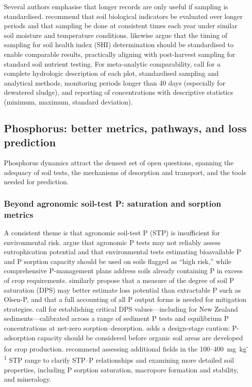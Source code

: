 \documentclass[11pt]{article}
\begin{document}
Several authors emphasise that longer records are only useful if sampling is standardised. \textcite{Sherbine2023} recommend that soil biological indicators be evaluated over longer periods and that sampling be done at consistent times each year under similar soil moisture and temperature conditions. \textcite{Li2023b} likewise argue that the timing of sampling for soil health index (SHI) determination should be standardised to enable comparable results, practically aligning with post-harvest sampling for standard soil nutrient testing. For meta-analytic comparability, \textcite{Ghirardini2019} call for a complete hydrologic description of each plot, standardised sampling and analytical methods, monitoring periods longer than 40 days (especially for dewatered sludge), and reporting of concentrations with descriptive statistics (minimum, maximum, standard deviation).

\subsection{Phosphorus: better metrics, pathways, and loss prediction}

Phosphorus dynamics attract the densest set of open questions, spanning the adequacy of soil tests, the mechanisms of desorption and transport, and the tools needed for prediction.

\subsubsection{Beyond agronomic soil-test P: saturation and sorption metrics}

A consistent theme is that agronomic soil-test P (STP) is insufficient for environmental risk. \textcite{Sharpley1995} argue that agronomic P tests may not reliably assess eutrophication potential and that environmental tests estimating bioavailable P and P sorption capacity should be used on soils flagged as ``high risk,'' while comprehensive P-management plans address soils already containing P in excess of crop requirements. \textcite{Hooda1999} similarly propose that a measure of the degree of soil P saturation (DPS) may better estimate loss potential than extractable P such as Olsen-P, and that a full accounting of all P output forms is needed for mitigation strategies. \textcite{Nguyen2002} call for establishing critical DPS values---including for New Zealand sediments---calibrated across a range of sediment P tests and equilibrium P concentrations at net-zero sorption--desorption. \textcite{MILLER1979} adds a design-stage caution: P-adsorption capacity should be considered before organic soil areas are developed for crop production. \textcite{Osterholz2020} recommend assessing additional fields in the 100--400~mg~kg\textsuperscript{-1} STP range to clarify STP--P relationships and examining more detailed soil properties, including P sorption saturation, macropore formation and stability, and mineralogy.
\end{document}
